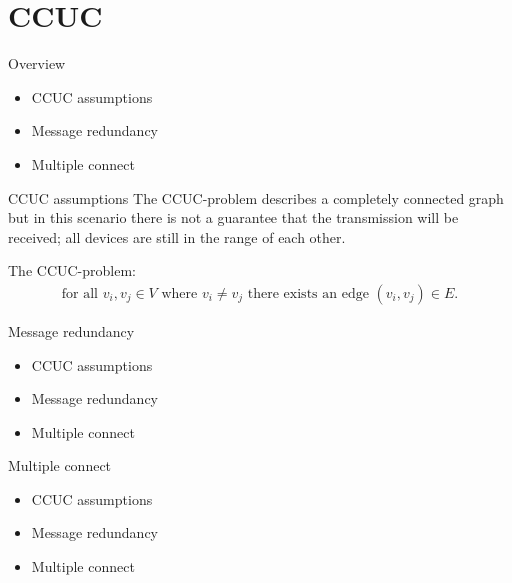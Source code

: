 \section{CCUC}
\begin{frame}{Overview}
  \begin{itemize}
    \item CCUC assumptions
    \item Message redundancy
    \item Multiple connect
  \end{itemize}
\end{frame}

\begin{frame}{CCUC assumptions}
The CCUC-problem describes a completely connected graph but in this scenario there is not a guarantee that the transmission will be received; all devices are still in the range of each other.

\begin{definition}
	The CCUC-problem:
	\begin{align*}
		\text{for all } v_i, v_j \in V \text{ where } v_i \neq v_j \text{ there exists an edge } (v_i, v_j) \in E.		%
	\end{align*}
\end{definition} 
\end{frame}

\begin{frame}{Message redundancy}
  \begin{itemize}
    \item CCUC assumptions
    \item Message redundancy
    \item Multiple connect
  \end{itemize}
\end{frame}

\begin{frame}{Multiple connect}
  \begin{itemize}
    \item CCUC assumptions
    \item Message redundancy
    \item Multiple connect
  \end{itemize}
\end{frame}